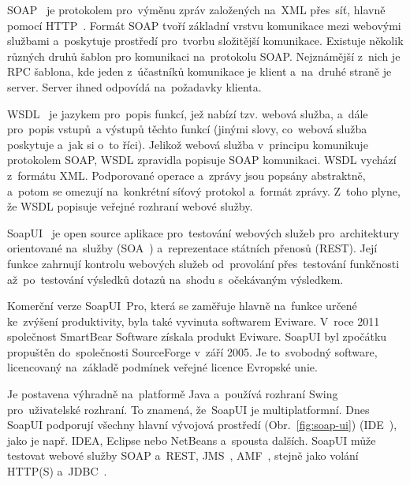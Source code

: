 
SOAP~\cite{soap} je protokolem pro~výměnu zpráv založených na~XML přes~síť, hlavně pomocí HTTP~\cite{http}. Formát SOAP tvoří základní vrstvu komunikace mezi webovými službami a~poskytuje prostředí pro~tvorbu složitější komunikace. Existuje několik různých druhů šablon pro komunikaci na~protokolu SOAP. Nejznámější z~nich je RPC šablona, kde jeden z~účastníků komunikace je klient a~na~druhé straně je server. Server ihned odpovídá na~požadavky klienta.

WSDL~\cite{wsdl} je jazykem pro~popis funkcí, jež nabízí tzv. webová služba, a~dále pro~popis vstupů~a výstupů těchto funkcí (jinými slovy, co~webová služba poskytuje a~jak si o~to říci). Jelikož webová služba v~principu komunikuje protokolem SOAP, WSDL zpravidla popisuje SOAP komunikaci. WSDL vychází z~formátu XML. Podporované operace a~zprávy jsou popsány abstraktně, a~potom se omezují na~konkrétní síťový protokol a~formát zprávy. Z~toho plyne, že WSDL popisuje veřejné rozhraní webové služby.

SoapUI~\cite{soapui} je open source aplikace pro~testování webových služeb pro~architektury orientované na~služby (SOA~\cite{soa}) a~reprezentace státních přenosů (REST). Její funkce zahrnují kontrolu webových služeb od~provolání přes~testování funkčnosti až~po~testování výsledků dotazů na~shodu s~očekávaným výsledkem.

Komerční verze SoapUI~Pro, která se zaměřuje hlavně na~funkce určené ke~zvýšení produktivity, byla také vyvinuta softwarem Eviware. V~roce 2011 společnost SmartBear Software získala produkt Eviware. SoapUI byl zpočátku propuštěn do~společnosti SourceForge v~září 2005. Je to~svobodný software, licencovaný na~základě podmínek veřejné licence Evropské unie. 

Je postavena výhradně na~platformě Java a~používá rozhraní Swing pro~uživatelské rozhraní. To znamená, že~SoapUI je multiplatformní. Dnes SoapUI podporují všechny hlavní vývojová prostředí (Obr.~\ref{fig:soap-ui}) (IDE~\cite{ide}), jako je např. IDEA, Eclipse nebo NetBeans a~spousta dalších. SoapUI může testovat webové služby SOAP a~REST, JMS~\cite{jms}, AMF~\cite{amf}, stejně jako volání HTTP(S) a~JDBC~\cite{jdbc}.


